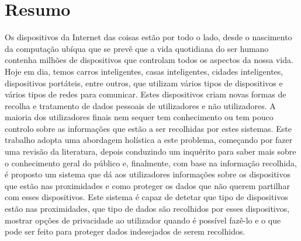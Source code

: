 %
%
\chapter*{Resumo}
\justify

Os dispositivos da Internet das coisas estão por todo o lado, desde
o nascimento da computação ubíqua que se prevê que a vida quotidiana
do ser humano contenha milhões de dispositivos que controlam todos os
aspectos da nossa vida. Hoje em dia, temos carros inteligentes, casas
inteligentes, cidades inteligentes, dispositivos portáteis, entre
outros, que utilizam vários tipos de dispositivos e vários tipos de
redes para comunicar. Estes dispositivos criam novas formas de recolha
e tratamento de dados pessoais de utilizadores e não utilizadores.
A maioria dos utilizadores finais nem sequer tem conhecimento ou tem
pouco controlo sobre as informações que estão a ser recolhidas por
estes sistemas. Este trabalho adopta uma abordagem holística a este
problema, começando por fazer uma revisão da literatura, depois conduzindo
um inquérito para saber mais sobre o conhecimento geral do público e,
finalmente, com base na informação recolhida, é proposto um sistema
que dá aos utilizadores informações sobre os dispositivos que estão
nas proximidades e como proteger os dados que não querem partilhar
com esses dispositivos. Este sistema é capaz de detetar que tipo de
dispositivos estão nas proximidades, que tipo de dados são recolhidos
por esses dispositivos, mostrar opções de privacidade ao utilizador
quando é possível fazê-lo e o que pode ser feito para proteger dados
indesejados de serem recolhidos.

